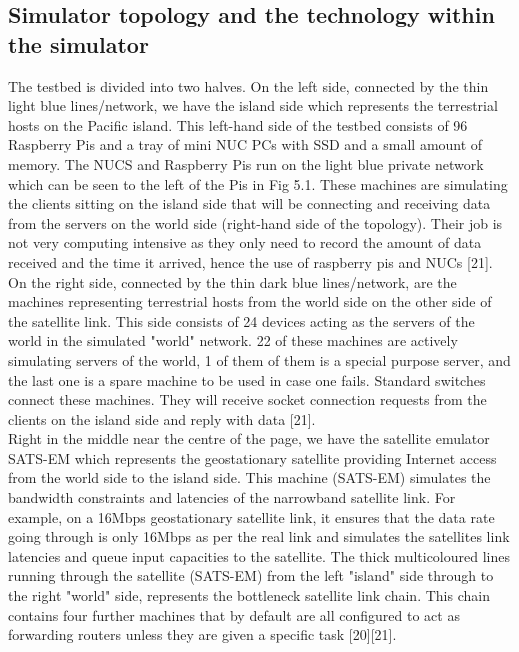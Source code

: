 \documentclass{uathesis}
\begin{document}
\subsection{Simulator topology and the technology within the simulator}
The testbed is divided into two halves. On the left side, connected by the thin light blue lines/network, we have the island side which represents the terrestrial hosts on the Pacific island. This left-hand side of the testbed consists of 96 Raspberry Pis and a tray of mini NUC PCs with SSD and a small amount of memory. The NUCS and Raspberry Pis run on the light blue private network which can be seen to the left of the Pis in Fig 5.1. These machines are simulating the clients sitting on the island side that will be connecting and receiving data from the servers on the world side (right-hand side of the topology). Their job is not very computing intensive as they only need to record the amount of data received and the time it arrived, hence the use of raspberry pis and NUCs [21]. \\

On the right side, connected by the thin dark blue lines/network, are the machines representing terrestrial hosts from the world side on the other side of the satellite link. This side consists of 24 devices acting as the servers of the world in the simulated "world" network. 22 of these machines are actively simulating servers of the world, 1 of them of them is a special purpose server, and the last one is a spare machine to be used in case one fails. Standard switches connect these machines. They will receive socket connection requests from the clients on the island side and reply with data [21]. \\

Right in the middle near the centre of the page, we have the satellite emulator SATS-EM which represents the geostationary satellite providing Internet access from the world side to the island side. This machine (SATS-EM) simulates the bandwidth constraints and latencies of the narrowband satellite link. For example, on a 16Mbps geostationary satellite link, it ensures that the data rate going through is only 16Mbps as per the real link and simulates the satellites link latencies and queue input capacities to the satellite. The thick multicoloured lines running through the satellite (SATS-EM) from the left "island" side through to the right "world" side, represents the bottleneck satellite link chain. This chain contains four further machines that by default are all configured to act as forwarding routers unless they are given a specific task [20][21].\\
\end{document}
